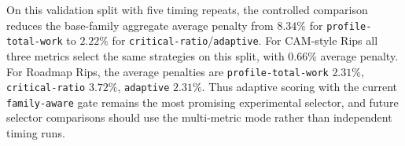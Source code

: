 On this validation split with five timing repeats, the controlled comparison reduces the base-family aggregate average penalty from $8.34\%$ for \texttt{profile-total-work} to $2.22\%$ for \texttt{critical-ratio}/\texttt{adaptive}.
For CAM-style Rips all three metrics select the same strategies on this split, with $0.66\%$ average penalty.
For Roadmap Rips, the average penalties are \texttt{profile-total-work} $2.31\%$, \texttt{critical-ratio} $3.72\%$, \texttt{adaptive} $2.31\%$.
Thus adaptive scoring with the current \texttt{family-aware} gate remains the most promising experimental selector, and future selector comparisons should use the multi-metric mode rather than independent timing runs.
